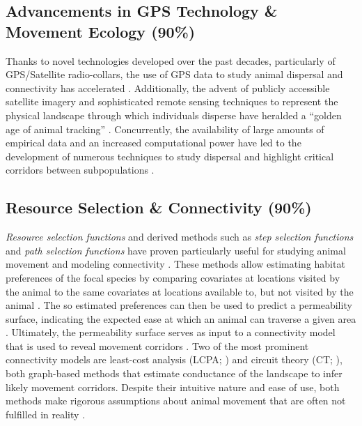 \documentclass[abstract=on,10pt,a4paper,bibliography=totocnumbered]{article}
\begin{document}
\subsection{Advancements in GPS Technology \& Movement Ecology (90\%)}
Thanks to novel technologies developed over the past decades, particularly of
GPS/Satellite radio-collars, the use of GPS data to study animal dispersal and
connectivity has accelerated \citep{Elliot.2014, Jonsson.2016, Williams.2019}.
Additionally, the advent of publicly accessible satellite imagery and
sophisticated remote sensing techniques to represent the physical landscape
through which individuals disperse have heralded a ``golden age of animal
tracking'' \citep{Kays.2015}. Concurrently, the availability of large amounts of
empirical data and an increased computational power have led to the development
of numerous techniques to study dispersal and highlight critical corridors
between subpopulations \citep{Boyce.2002, Fortin.2005, Cushman.2010,
Zeller.2012, Diniz.2020}.

\subsection{Resource Selection \& Connectivity (90\%)}
\textit{Resource selection functions} \citep{Boyce.2002} and derived methods
such as \textit{step selection functions} \citep{Fortin.2005} and \textit{path
selection functions} \citep{Cushman.2010} have proven particularly useful for
studying animal movement \citep{Fieberg.2020} and modeling connectivity
\citep{Diniz.2020}. These methods allow estimating habitat preferences of the
focal species by comparing covariates at locations visited by the animal to the
same covariates at locations available to, but not visited by the animal
\citep{Boyce.2002, Fortin.2005, Cushman.2010, Thurfjell.2014}. The so estimated
preferences can then be used to predict a permeability surface, indicating the
expected ease at which an animal can traverse a given area \citep{Spear.2010,
Zeller.2012, Etherington.2016}. Ultimately, the permeability surface serves as
input to a connectivity model that is used to reveal movement corridors
\citep{Diniz.2020}. Two of the most prominent connectivity models are least-cost
analysis (LCPA; \citealp{Adriaensen.2003}) and circuit theory (CT;
\citealp{McRae.2006, McRae.2008}), both graph-based methods that estimate
conductance of the landscape to infer likely movement corridors. Despite their
intuitive nature and ease of use, both methods make rigorous assumptions about
animal movement that are often not fulfilled in reality \citep{Diniz.2020}.
\end{document}
